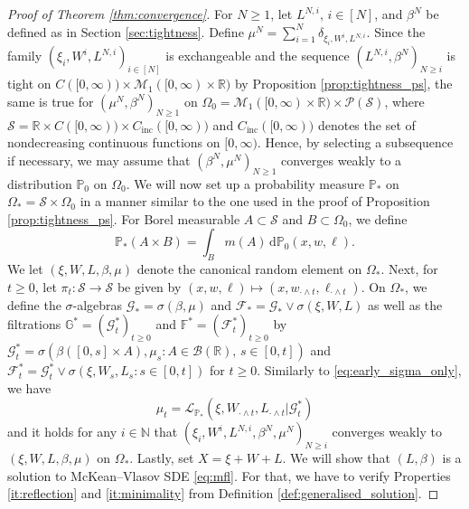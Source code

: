 \documentclass[11pt, a4paper]{article}
\theoremstyle{plain}
\theoremstyle{definition}
\theoremstyle{remark}
\numberwithin{equation}{section}
\newcommand{\pr}{\mathbb{P}}
\newcommand{\R}{\mathbb{R}}
\renewcommand{\P}{\mathcal{P}}
\newcommand{\F}{\mathcal{F}}
\renewcommand{\L}{\mathcal{L}}
\renewcommand{\d}{\mathrm{d}}
\newcommand{\define}{\mathpunct{:}}
\newcommand{\bb}[1]{\mathbb{#1}}
\renewcommand{\cal}[1]{\mathcal{#1}}
\begin{document}
\begin{proof}[Proof of Theorem \ref{thm:convergence}]
For $N \geq 1$, let $L^{N, i}$, $i \in [N]$, and $\beta^N$ be defined as in Section \ref{sec:tightness}. Define $\mu^N = \sum_{i = 1}^N \delta_{\xi_i, W^i, L^{N, i}}$. Since the family $(\xi_i, W^i, L^{N, i})_{i \in [N]}$ is exchangeable and the sequence $(L^{N, i}, \beta^N)_{N \geq i}$ is tight on $C([0, \infty)) \times \cal{M}_1([0, \infty) \times \R)$ by Proposition \ref{prop:tightness_ps}, the same is true for $(\mu^N, \beta^N)_{N \geq 1}$ on $\Omega_0 = \cal{M}_1([0, \infty) \times \R) \times \P(\cal{S})$, where $\cal{S} = \R \times C([0, \infty)) \times C_{\text{inc}}([0, \infty))$ and $C_{\text{inc}}([0, \infty))$ denotes the set of nondecreasing continuous functions on $[0, \infty)$. Hence, by selecting a subsequence if necessary, we may assume that $(\beta^N, \mu^N)_{N \geq 1}$ converges weakly to a distribution $\pr_0$ on $\Omega_0$. We will now set up a probability measure $\pr_{\ast}$ on $\Omega_{\ast} = \cal{S} \times \Omega_0$ in a manner similar to the one used in the proof of Proposition \ref{prop:tightness_ps}. For Borel measurable $A \subset \cal{S}$ and $B \subset \Omega_0$, we define
\begin{equation*}
    \pr_{\ast}(A \times B) = \int_B m(A) \, \d \pr_0(x, w, \ell).
\end{equation*}
We let $(\xi, W, L, \beta, \mu)$ denote the canonical random element on $\Omega_{\ast}$. Next, for $t \geq 0$, let $\pi_t \define \cal{S} \to \cal{S}$ be given by $(x, w, \ell) \mapsto (x, w_{\cdot \land t}, \ell_{\cdot \land t})$. On $\Omega_{\ast}$, we define the $\sigma$-algebras $\cal{G}_{\ast} = \sigma(\beta, \mu)$ and $\F_{\ast} = \cal{G}_{\ast} \lor \sigma(\xi, W, L)$ as well as the filtrations $\bb{G}^{\ast} = (\cal{G}^{\ast}_t)_{t \geq 0}$ and $\bb{F}^{\ast} = (\F^{\ast}_t)_{t \geq 0}$ by $\cal{G}^{\ast}_t = \sigma(\beta([0, s] \times A), \mu_s \define A \in \cal{B}(\R),\, s \in [0, t])$ and $\F^{\ast}_t = \cal{G}^{\ast}_t \lor \sigma(\xi, W_s, L_s \define s \in [0, t])$ for $t \geq 0$. Similarly to \eqref{eq:early_sigma_only}, we have
\begin{equation*}
    \mu_t = \L_{\pr_{\ast}}(\xi, W_{\cdot \land t}, L_{\cdot \land t} \vert \cal{G}^{\ast}_t)
\end{equation*}
and it holds for any $i \in \bb{N}$ that $(\xi_i, W^i, L^{N, i}, \beta^N, \mu^N)_{N \geq i}$ converges weakly to $(\xi, W, L, \beta, \mu)$ on $\Omega_{\ast}$. Lastly, set $X = \xi + W + L$. We will show that $(L, \beta)$ is a solution to McKean--Vlasov SDE \eqref{eq:mfl}. For that, we have to verify Properties \ref{it:reflection} and \ref{it:minimality} from Definition \ref{def:generalised_solution}. 


\end{proof}
\end{document}
